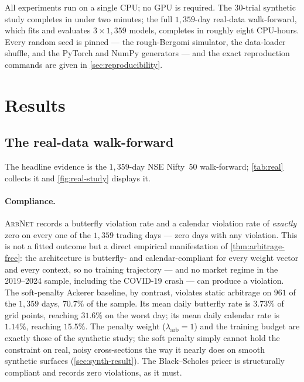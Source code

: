 \documentclass[largeformat]{interact}
\theoremstyle{plain}
\theoremstyle{definition}
\newcommand{\arbnet}{\textsc{ArbNet}}
\newcommand{\bs}{Black--Scholes}
\begin{document}
All experiments run on a single CPU; no GPU is required. The $30$-trial synthetic study completes in under two minutes; the full $1{,}359$-day real-data walk-forward, which fits and evaluates $3 \times 1{,}359$ models, completes in roughly eight CPU-hours. Every random seed is pinned --- the rough-Bergomi simulator, the data-loader shuffle, and the PyTorch and NumPy generators --- and the exact reproduction commands are given in \cref{sec:reproducibility}.

\section{Results}
\label{sec:results}

\subsection{The real-data walk-forward}
\label{sec:real-result}

The headline evidence is the $1{,}359$-day NSE Nifty~50 walk-forward; \cref{tab:real} collects it and \cref{fig:real-study} displays it.

\paragraph{Compliance.}
\arbnet{} records a butterfly violation rate and a calendar violation rate of \emph{exactly} zero on every one of the $1{,}359$ trading days --- zero days with any violation. This is not a fitted outcome but a direct empirical manifestation of \cref{thm:arbitrage-free}: the architecture is butterfly- and calendar-compliant for every weight vector and every context, so no training trajectory --- and no market regime in the 2019--2024 sample, including the COVID-19 crash --- can produce a violation. The soft-penalty Ackerer baseline, by contrast, violates static arbitrage on $961$ of the $1{,}359$ days, $70.7\%$ of the sample. Its mean daily butterfly rate is $3.73\%$ of grid points, reaching $31.6\%$ on the worst day; its mean daily calendar rate is $1.14\%$, reaching $15.5\%$. The penalty weight ($\lambda_{\mathrm{arb}} = 1$) and the training budget are exactly those of the synthetic study; the soft penalty simply cannot hold the constraint on real, noisy cross-sections the way it nearly does on smooth synthetic surfaces (\cref{sec:synth-result}). The \bs{} pricer is structurally compliant and records zero violations, as it must.
\end{document}
